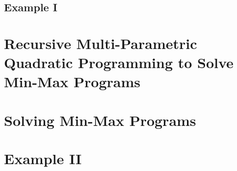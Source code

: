 \documentclass[journal]{IEEEtran}
\theoremstyle{remark}
\theoremstyle{definition}
\begin{document}
\subsection{Example I}

\section{Recursive Multi-Parametric Quadratic Programming to Solve Min-Max Programs}

\section{Solving Min-Max Programs}

\section{Example II}



%
%

\end{document}
